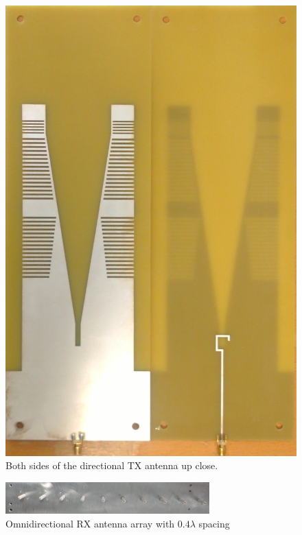 \begin{figure}[H]
\begin{minipage}[H]{0.4\textwidth}
    \includegraphics[width=\textwidth]{pictures/Measurement/dirrecional_antenna.jpg}
    \caption{Both sides of the directional TX antenna up close.}
  \end{minipage}
\end{figure}



\begin{figure}[H]
\centering
\includegraphics[width=0.7\textwidth]{pictures/Measurement/antenna_array.jpg}
    \caption{Omnidirectional RX antenna array with $0.4 \lambda$ spacing}
    \label{DirAnt}
\end{figure}

